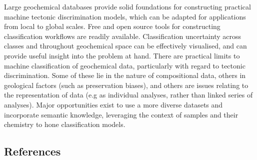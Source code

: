 \documentclass[a4,10pt]{article}
\begin{document}
\begin{multicols*}{2}[]
	Large geochemical databases provide solid foundations for constructing practical machine tectonic discrimination models, which can be adapted for applications from local to global scales. Free and open source tools for constructing classification workflows are readily available. Classification uncertainty across classes and throughout geochemical space can be effectively visualised, and can provide useful insight into the problem at hand. There are practical limits to machine classification of geochemical data, particularly with regard to tectonic discrimination. Some of these lie in the nature of compositional data, others in geological factors (such as preservation biases), and others are issues relating to the representation of data (e.g as individual analyses, rather than linked series of analyses). Major opportunities exist to use a more diverse datasets and incorporate semantic knowledge, leveraging the context of samples and their chemistry to hone classification models.
	
	\begin{singlespace*}
	\subsection*{References}
	\footnotesize{
		
	}
	\end{singlespace*}
	\end{multicols*}
	
	
\end{document}
